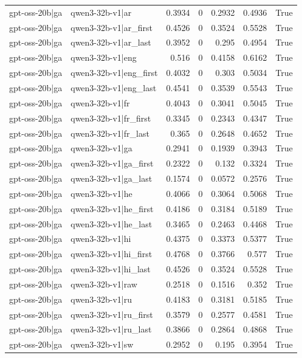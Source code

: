 \begin{table}
\begin{tabular}{l l r r r r l}
gpt-oss-20b|ga & qwen3-32b-v1|ar & 0.3934 & 0 & 0.2932 & 0.4936 & True \\
gpt-oss-20b|ga & qwen3-32b-v1|ar_first & 0.4526 & 0 & 0.3524 & 0.5528 & True \\
gpt-oss-20b|ga & qwen3-32b-v1|ar_last & 0.3952 & 0 & 0.295 & 0.4954 & True \\
gpt-oss-20b|ga & qwen3-32b-v1|eng & 0.516 & 0 & 0.4158 & 0.6162 & True \\
gpt-oss-20b|ga & qwen3-32b-v1|eng_first & 0.4032 & 0 & 0.303 & 0.5034 & True \\
gpt-oss-20b|ga & qwen3-32b-v1|eng_last & 0.4541 & 0 & 0.3539 & 0.5543 & True \\
gpt-oss-20b|ga & qwen3-32b-v1|fr & 0.4043 & 0 & 0.3041 & 0.5045 & True \\
gpt-oss-20b|ga & qwen3-32b-v1|fr_first & 0.3345 & 0 & 0.2343 & 0.4347 & True \\
gpt-oss-20b|ga & qwen3-32b-v1|fr_last & 0.365 & 0 & 0.2648 & 0.4652 & True \\
gpt-oss-20b|ga & qwen3-32b-v1|ga & 0.2941 & 0 & 0.1939 & 0.3943 & True \\
gpt-oss-20b|ga & qwen3-32b-v1|ga_first & 0.2322 & 0 & 0.132 & 0.3324 & True \\
gpt-oss-20b|ga & qwen3-32b-v1|ga_last & 0.1574 & 0 & 0.0572 & 0.2576 & True \\
gpt-oss-20b|ga & qwen3-32b-v1|he & 0.4066 & 0 & 0.3064 & 0.5068 & True \\
gpt-oss-20b|ga & qwen3-32b-v1|he_first & 0.4186 & 0 & 0.3184 & 0.5189 & True \\
gpt-oss-20b|ga & qwen3-32b-v1|he_last & 0.3465 & 0 & 0.2463 & 0.4468 & True \\
gpt-oss-20b|ga & qwen3-32b-v1|hi & 0.4375 & 0 & 0.3373 & 0.5377 & True \\
gpt-oss-20b|ga & qwen3-32b-v1|hi_first & 0.4768 & 0 & 0.3766 & 0.577 & True \\
gpt-oss-20b|ga & qwen3-32b-v1|hi_last & 0.4526 & 0 & 0.3524 & 0.5528 & True \\
gpt-oss-20b|ga & qwen3-32b-v1|raw & 0.2518 & 0 & 0.1516 & 0.352 & True \\
gpt-oss-20b|ga & qwen3-32b-v1|ru & 0.4183 & 0 & 0.3181 & 0.5185 & True \\
gpt-oss-20b|ga & qwen3-32b-v1|ru_first & 0.3579 & 0 & 0.2577 & 0.4581 & True \\
gpt-oss-20b|ga & qwen3-32b-v1|ru_last & 0.3866 & 0 & 0.2864 & 0.4868 & True \\
gpt-oss-20b|ga & qwen3-32b-v1|sw & 0.2952 & 0 & 0.195 & 0.3954 & True \\

\end{tabular}
\end{table}
